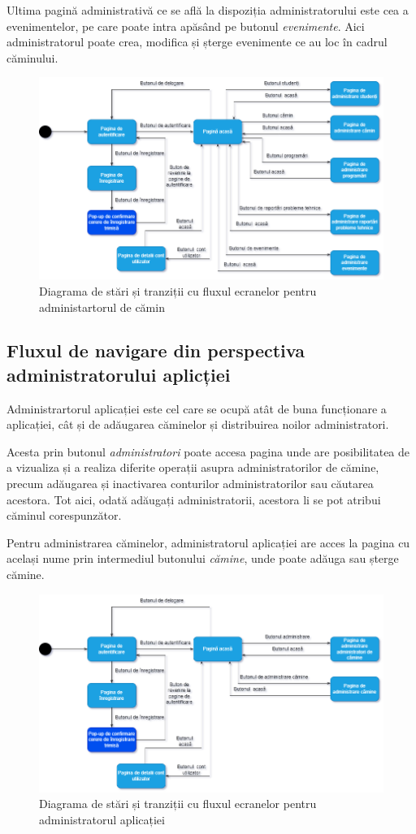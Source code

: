 \documentclass[12pt,a4paper]{report}
\theoremstyle{definition}
\theoremstyle{remark}
\begin{document}
\par Ultima pagină administrativă ce se află la dispoziția administratorului este cea a evenimentelor, pe care poate intra apăsând pe butonul \textit{evenimente}. Aici administratorul poate crea, modifica și șterge evenimente ce au loc în cadrul căminului.

\begin{figure}[H]
    \centering
    \includegraphics[width=0.75\linewidth]{resurse/diagrame/diagrama_de_navigare.2drawio.png}
    \caption{Diagrama de stări și tranziții cu fluxul ecranelor pentru administartorul de cămin}
\end{figure}

\subsection{Fluxul de navigare din perspectiva administratorului aplicției}
\par Administrartorul aplicației este cel care se ocupă atât de buna funcționare a aplicației, cât și de adăugarea căminelor și distribuirea noilor administratori.

\par Acesta prin butonul \textit{administratori} poate accesa pagina unde are posibilitatea de a vizualiza și  a realiza diferite operații asupra administratorilor de cămine, precum adăugarea și inactivarea conturilor administratorilor sau căutarea acestora. Tot aici, odată adăugați administratorii, acestora li se pot atribui căminul corespunzător.

\par Pentru administrarea căminelor, administratorul aplicației are acces la pagina cu același nume prin intermediul butonului \textit{cămine}, unde poate adăuga sau șterge cămine.

\begin{figure}[H]
    \centering
    \includegraphics[width=0.75\linewidth]{resurse/diagrame/diagrama_de_navigare3.drawio.png}
    \caption{Diagrama de stări și tranziții cu fluxul ecranelor pentru administratorul aplicației}
\end{figure}
\end{document}
